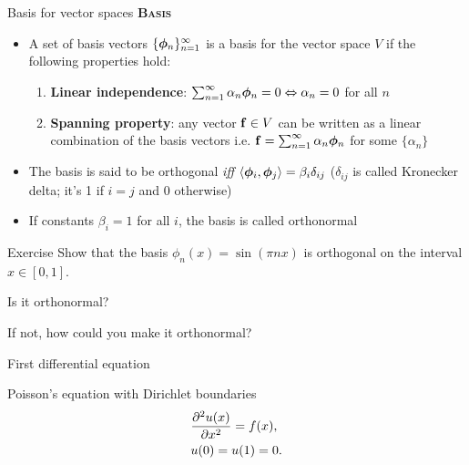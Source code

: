 
\begin{frame}{Basis for vector spaces}	
	\textbf{\textsc{Basis}}
	\begin{itemize}
		\item A set of \alert{basis vectors} $ \{\ffor_n \}_{n=1}^\infty $ is a basis for the vector space $ V $ if the following properties hold:
		\begin{enumerate}
			\item \textbf{Linear independence}: $ \sum_{n=1}^{\infty} \alpha_n \ffor_{n} = 0 \Leftrightarrow \alpha_n = 0 $ for all $ n $
			\item \textbf{Spanning property}: any vector $ \fone \in V $ can be written as a linear combination of the basis vectors i.e. $ \fone = \sum_{n=1}^\infty \alpha_n \ffor_n $ for some $ \{ \alpha_n \} $ 
		\end{enumerate}
		\item The basis is said to be \alert{orthogonal} \textit{iff} $ \iprod{\ffor_i}{\ffor_j} = \beta_{i}
		\delta_{ij} $ ($ \delta_{ij} $ is called Kronecker delta; it's 1 if $ i = j $ and 0 otherwise) 
		\item If constants $ \beta_{i} = 1 $ for all $ i$, the basis is called \alert{orthonormal}
	\end{itemize}
\end{frame}



\begin{frame}{Exercise \exercisen}
	Show that the basis $ \phi_n (x) = \sin(\pi n x) $ is orthogonal on the interval $x \in [0,1] $. 
	
	Is it orthonormal? 
	
	If not, how could you make it orthonormal?
\end{frame}


\begin{frame}{First differential equation}
	\begin{block}{\centering Poisson's equation with Dirichlet boundaries}
		\begin{align*}
			&\pfrac[2]{u(x)}{x} = f(x), \\
			&u(0) = u(1) = 0.
		\end{align*}
	\end{block}
\end{frame}

